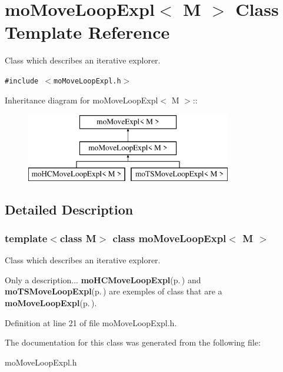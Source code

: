 \section{mo\-Move\-Loop\-Expl$<$ M $>$ Class Template Reference}
\label{classmo_move_loop_expl}
Class which describes an iterative explorer.  


{\tt \#include $<$mo\-Move\-Loop\-Expl.h$>$}

Inheritance diagram for mo\-Move\-Loop\-Expl$<$ M $>$::\begin{figure}[H]
\begin{center}
\leavevmode
\includegraphics[height=3cm]{classmo_move_loop_expl}
\end{center}
\end{figure}


\subsection{Detailed Description}
\subsubsection*{template$<$class M$>$ class mo\-Move\-Loop\-Expl$<$ M $>$}

Class which describes an iterative explorer. 

Only a description... {\bf mo\-HCMove\-Loop\-Expl}{\rm (p.\,\pageref{classmo_h_c_move_loop_expl})} and {\bf mo\-TSMove\-Loop\-Expl}{\rm (p.\,\pageref{classmo_t_s_move_loop_expl})} are exemples of class that are a {\bf mo\-Move\-Loop\-Expl}{\rm (p.\,\pageref{classmo_move_loop_expl})}. 



Definition at line 21 of file mo\-Move\-Loop\-Expl.h.

The documentation for this class was generated from the following file:\begin{CompactItemize}
\item 
mo\-Move\-Loop\-Expl.h\end{CompactItemize}
